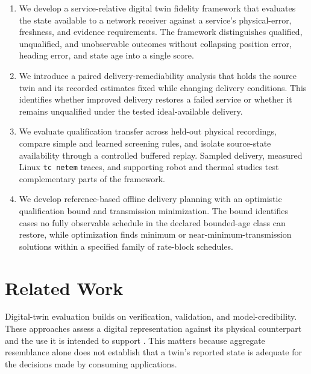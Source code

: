 \documentclass[journal]{IEEEtran}
\newcommand{\new}[1]{#1}
\newcommand{\rev}[1]{#1}
\newcommand{\revision}[1]{#1}
\begin{document}
\begin{enumerate}
    \setlength{\itemsep}{0pt}
    \setlength{\parsep}{0pt}
    \setlength{\topsep}{2pt}
    \item We develop a service-relative digital twin fidelity framework that evaluates the state available to a network receiver against a service's physical-error, freshness, and evidence requirements. The framework distinguishes qualified, unqualified, and unobservable outcomes without collapsing position error, heading error, and state age into a single score.

    \item We introduce a paired delivery-remediability analysis that holds the source twin and its recorded estimates fixed while changing delivery conditions. This identifies whether improved delivery restores a failed service or whether it remains unqualified under the tested ideal-available delivery.

    \item \revision{We evaluate qualification transfer across held-out
    physical recordings, compare simple and learned screening rules, and
    isolate source-state availability through a controlled buffered replay.
    Sampled delivery, measured Linux \texttt{tc netem} traces, and supporting
    robot and thermal studies test complementary parts of the framework.}

    \item \new{We develop reference-based offline delivery planning with
    an optimistic qualification bound and transmission minimization.
    The bound identifies cases \rev{no fully observable schedule in the
    declared bounded-age class can restore},
    while optimization finds minimum or near-minimum-transmission solutions within a
    specified family of rate-block schedules.}
\end{enumerate}
\section{Related Work}
\label{sec:related_work}

Digital-twin evaluation builds on verification, validation, and
model-credibility. These approaches assess a digital representation
against its physical counterpart and the use it is intended to support
\cite{jones2020characterising,shao2023credibility,bitencourt2025vv}.
This matters because aggregate resemblance alone does not establish that
a twin's reported state is adequate for the decisions made by consuming
applications.
\end{document}

